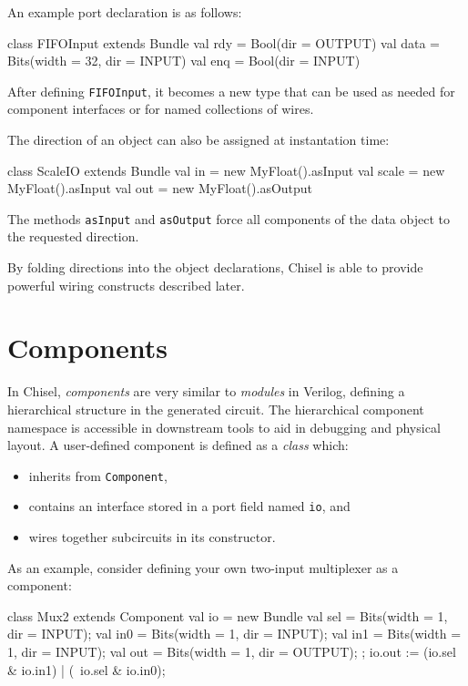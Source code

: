 \documentclass[10pt]{article}
\def\code#1{{\tt #1}}
\begin{document}
An example port declaration is as follows:
\begin{scala}
class FIFOInput extends Bundle {
  val rdy  = Bool(dir = OUTPUT)
  val data = Bits(width = 32, dir = INPUT)
  val enq  = Bool(dir = INPUT)
}
\end{scala}

\noindent
After defining \code{FIFOInput}, it becomes a new type that can be
used as needed for component interfaces or for named collections of
wires.

The direction of an object can also be assigned at instantation time:
\begin{scala}
class ScaleIO extends Bundle {
  val in    = new MyFloat().asInput
  val scale = new MyFloat().asInput
  val out   = new MyFloat().asOutput
}
\end{scala}

\noindent
The methods \code{asInput} and \code{asOutput} force all components of
the data object to the requested direction.

By folding directions into the object declarations, Chisel is able to
provide powerful wiring constructs described later.



\section{Components}

In Chisel, {\em components} are very similar to {\em modules} in
Verilog, defining a hierarchical structure in the generated circuit.
The hierarchical component namespace is accessible in downstream tools
to aid in debugging and physical layout.  A user-defined component is
defined as a {\em class} which:
\begin{itemize}
\item inherits from \code{Component},
\item contains an interface stored in a port field named \code{io}, and
\item wires together subcircuits in its constructor.
\end{itemize}
As an example, consider defining your own two-input multiplexer as a
component:
\begin{scala}
class Mux2 extends Component {
  val io = new Bundle{
    val sel = Bits(width = 1, dir = INPUT);
    val in0 = Bits(width = 1, dir = INPUT);
    val in1 = Bits(width = 1, dir = INPUT);
    val out = Bits(width = 1, dir = OUTPUT);
  };
  io.out := (io.sel & io.in1) | (~io.sel & io.in0);
}
\end{scala}
\end{document}

